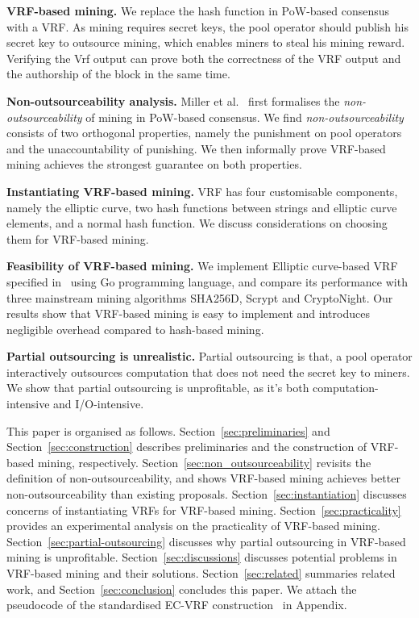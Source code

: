 \textbf{VRF-based mining.} 
We replace the hash function in PoW-based consensus with a VRF.
As mining requires secret keys, the pool operator should publish his secret key to outsource mining, which enables miners to steal his mining reward.
Verifying the Vrf output can prove both the correctness of the VRF output and the authorship of the block in the same time.

\textbf{Non-outsourceability analysis.}
Miller et al.~\cite{miller2015nonoutsourceable} first formalises the \emph{non-outsourceability} of mining in PoW-based consensus.
We find \emph{non-outsourceability} consists of two orthogonal properties, namely the punishment on pool operators and the unaccountability of punishing.
We then informally prove VRF-based mining achieves the strongest guarantee on both properties.

\textbf{Instantiating VRF-based mining.}
VRF has four customisable components, namely the elliptic curve, two hash functions between strings and elliptic curve elements, and a normal hash function.
We discuss considerations on choosing them for VRF-based mining.

\textbf{Feasibility of VRF-based mining.}
We implement Elliptic curve-based VRF specified in~\cite{goldberg2017draft} using Go programming language, and compare its performance with three mainstream mining algorithms SHA256D, Scrypt and CryptoNight.
Our results show that VRF-based mining is easy to implement and introduces negligible overhead compared to hash-based mining.

\textbf{Partial outsourcing is unrealistic.}
Partial outsourcing is that, a pool operator interactively outsources computation that does not need the secret key to miners.
We show that partial outsourcing is unprofitable, as it's both computation-intensive and I/O-intensive.

This paper is organised as follows.
Section~\ref{sec:preliminaries} and Section~\ref{sec:construction} describes preliminaries and the construction of VRF-based mining, respectively.
Section~\ref{sec:non_outsourceability} revisits the definition of non-outsourceability, and shows VRF-based mining achieves better non-outsourceability than existing proposals.
Section~\ref{sec:instantiation} discusses concerns of instantiating VRFs for VRF-based mining.
Section~\ref{sec:practicality} provides an experimental analysis on the practicality of VRF-based mining.
Section~\ref{sec:partial-outsourcing} discusses why partial outsourcing in VRF-based mining is unprofitable.
Section~\ref{sec:discussions} discusses potential problems in VRF-based mining and their solutions.
Section~\ref{sec:related} summaries related work, and Section~\ref{sec:conclusion} concludes this paper.
We attach the pseudocode of the standardised EC-VRF construction~\cite{goldberg2017draft} in Appendix.
